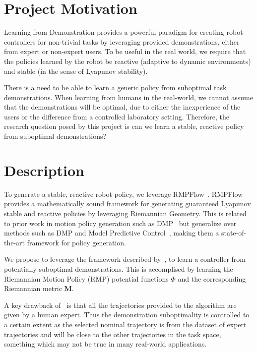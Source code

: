 \section{Project Motivation}

Learning from Demonstration provides a powerful paradigm for creating robot controllers for non-trivial tasks by leveraging provided demonstrations, either from expert or non-expert users.
To be useful in the real world, we require that the policies learned by the robot be reactive (adaptive to dynamic environments) and stable (in the sense of Lyapunov stability).

There is a need to be able to learn a generic policy from suboptimal task demonstrations.
When learning from humans in the real-world, we cannot assume that the demonstrations will be optimal, due to either the inexperience of the users or the difference from a controlled laboratory setting. Therefore, the research question posed by this project is can we learn a stable, reactive policy from suboptimal demonstrations?

\vspace{-1em}
\section{Description}

To generate a stable, reactive robot policy, we leverage RMPFlow~\cite{Rana20corl}. RMPFlow provides a mathematically sound framework for generating guaranteed Lyapunov stable and reactive policies by leveraging Riemannian Geometry. This is related to prior work in motion policy generation such as DMP~\cite{Schaal06amam} but generalize over methods such as DMP and Model Predictive Control~\cite{Ratliff18arxiv}, making them a state-of-the-art framework for policy generation.

We propose to leverage the framework described by~\cite{Rana20corl}, to learn a controller from potentially suboptimal demonstrations. This is accomplised by learning the Riemannian Motion Policy (RMP) potential functions $\Phi$ and the corresponding Riemannian metric \textbf{M}.

A key drawback of~\cite{Rana20corl} is that all the trajectories provided to the algorithm are given by a human expert. Thus the demonstration suboptimality is controlled to a certain extent as the selected nominal trajectory is from the dataset of expert trajectories and will be close to the other trajectories in the task space, something which may not be true in many real-world applications.

